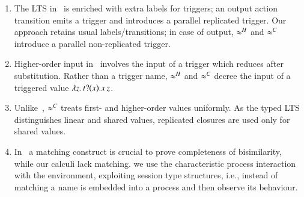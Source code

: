 \begin{enumerate}[$\bullet$]
\item 
The LTS in~\cite{JeffreyR05} is enriched with extra labels for triggers;
an output action transition emits a trigger and introduces a parallel replicated trigger.
Our 
approach retains usual labels/transitions; in  case of output,
$\approx^H$ and $\approx^C$
introduce a parallel
non-replicated trigger.
\item Higher-order input in~\cite{JeffreyR05} involves 
the input of a trigger which reduces after substitution.
Rather than a trigger name, %
$\approx^H$ and $\approx^C$
decree the input of a triggered value $\lambda z.\,t ? (x) . x\, {z}$.
\item Unlike~\cite{JeffreyR05}, 
$\approx^C$ treats  
first- and higher-order values uniformly. %
As the typed LTS distinguishes linear and shared values,
replicated closures are used only for shared values.

\item In~\cite{JeffreyR05} a matching construct is
crucial to prove completeness of bisimilarity,
while our calculi lack matching. 
we use the characteristic
process interaction with the environment, exploiting 
session type structures, i.e., instead of matching 
a name is embedded into a process and then observe its behaviour.


\end{enumerate}

